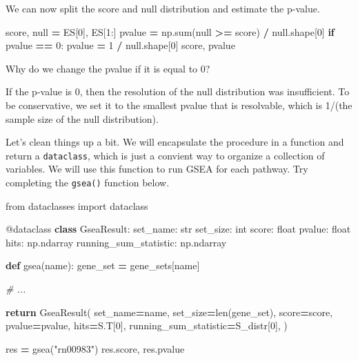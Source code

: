 \documentclass[
]{book}
\newenvironment{Shaded}{\begin{snugshade}}{\end{snugshade}}
\newcommand{\AttributeTok}[1]{\textcolor[rgb]{0.13,0.29,0.53}{#1}}
\newcommand{\BuiltInTok}[1]{#1}
\newcommand{\CommentTok}[1]{\textcolor[rgb]{0.56,0.35,0.01}{\textit{#1}}}
\newcommand{\ControlFlowTok}[1]{\textcolor[rgb]{0.13,0.29,0.53}{\textbf{#1}}}
\newcommand{\DecValTok}[1]{\textcolor[rgb]{0.00,0.00,0.81}{#1}}
\newcommand{\ImportTok}[1]{#1}
\newcommand{\KeywordTok}[1]{\textcolor[rgb]{0.13,0.29,0.53}{\textbf{#1}}}
\newcommand{\NormalTok}[1]{#1}
\newcommand{\OperatorTok}[1]{\textcolor[rgb]{0.81,0.36,0.00}{\textbf{#1}}}
\newcommand{\StringTok}[1]{\textcolor[rgb]{0.31,0.60,0.02}{#1}}
\begin{document}
We can now split the score and null distribution and estimate the p-value.

\begin{Shaded}
\begin{Highlighting}[numbers=left,,]
\NormalTok{score, null }\OperatorTok{=}\NormalTok{ ES[}\DecValTok{0}\NormalTok{], ES[}\DecValTok{1}\NormalTok{:]}
\NormalTok{pvalue }\OperatorTok{=}\NormalTok{ np.}\BuiltInTok{sum}\NormalTok{(null }\OperatorTok{\textgreater{}=}\NormalTok{ score) }\OperatorTok{/}\NormalTok{ null.shape[}\DecValTok{0}\NormalTok{]}
\ControlFlowTok{if}\NormalTok{ pvalue }\OperatorTok{==} \DecValTok{0}\NormalTok{:}
\NormalTok{    pvalue }\OperatorTok{=} \DecValTok{1} \OperatorTok{/}\NormalTok{ null.shape[}\DecValTok{0}\NormalTok{]}
\NormalTok{score, pvalue}
\end{Highlighting}
\end{Shaded}

Why do we change the pvalue if it is equal to 0?

If the p-value is 0, then the resolution of the null distribution was insufficient. To be conservative, we set it to the
smallest pvalue that is resolvable, which is 1/(the sample size of the null distribution).

Let's clean things up a bit. We will encapsulate the procedure in a function and
return a \texttt{dataclass}, which is just a convient way to organize a collection of variables.
We will use this function to run GSEA for each pathway. Try completing the \texttt{gsea()} function below.

\begin{Shaded}
\begin{Highlighting}[numbers=left,,]
\ImportTok{from}\NormalTok{ dataclasses }\ImportTok{import}\NormalTok{ dataclass}

\AttributeTok{@dataclass}
\KeywordTok{class}\NormalTok{ GseaResult:}
\NormalTok{    set\_name: }\BuiltInTok{str}
\NormalTok{    set\_size: }\BuiltInTok{int}
\NormalTok{    score: }\BuiltInTok{float}
\NormalTok{    pvalue: }\BuiltInTok{float}
\NormalTok{    hits: np.ndarray}
\NormalTok{    running\_sum\_statistic: np.ndarray}
    
\KeywordTok{def}\NormalTok{ gsea(name):}
\NormalTok{    gene\_set }\OperatorTok{=}\NormalTok{ gene\_sets[name]}
    
    \CommentTok{\# ...}

    \ControlFlowTok{return}\NormalTok{ GseaResult(}
\NormalTok{        set\_name}\OperatorTok{=}\NormalTok{name,}
\NormalTok{        set\_size}\OperatorTok{=}\BuiltInTok{len}\NormalTok{(gene\_set),}
\NormalTok{        score}\OperatorTok{=}\NormalTok{score,}
\NormalTok{        pvalue}\OperatorTok{=}\NormalTok{pvalue,}
\NormalTok{        hits}\OperatorTok{=}\NormalTok{S.T[}\DecValTok{0}\NormalTok{],}
\NormalTok{        running\_sum\_statistic}\OperatorTok{=}\NormalTok{S\_distr[}\DecValTok{0}\NormalTok{],}
\NormalTok{    )}

\NormalTok{res }\OperatorTok{=}\NormalTok{ gsea(}\StringTok{"rn00983"}\NormalTok{)}
\NormalTok{res.score, res.pvalue}
\end{Highlighting}
\end{Shaded}
\end{document}
